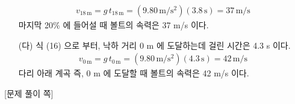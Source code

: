 \documentclass[APS,floatfix,nofootinbib,superscriptaddress,fleqn,preprint]{revtex4}
\begin{document}
\begin{itemize}
  \begin{align}
    v_{18\,\mathrm{m}} = g\,t_{18\,\mathrm{m}} = \left({9.80\,\mathrm{m/s^2}}\right) \left(3.8\,\mathrm{s}\right) = 37\,\mathrm{m/s}
  \end{align}
  마지막 20\% 에 들어설 때 볼트의 속력은 37 m/s 이다.
  \item[(다)] 식 (16) 으로 부터, 낙하 거리 0 m 에 도달하는데 걸린 시간은 4.3 s 이다.
  \begin{align}
    v_{0\,\mathrm{m}} = g\,t_{0\,\mathrm{m}} = \left({9.80\,\mathrm{m/s^2}}\right) \left(4.3\,\mathrm{s}\right) = 42\,\mathrm{m/s} 
  \end{align}
  다리 아래 계곡 즉, 0 m 에 도달할 때 볼트의 속력은 42 m/s 이다.
\end{itemize} 
  

\newpage

{\color{gray} [문제 풀이 쪽]}

\newpage
\end{document}
